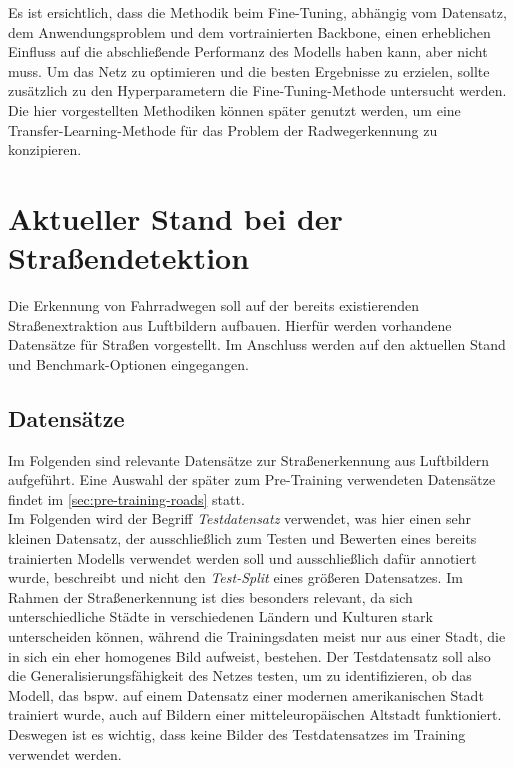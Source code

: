 Es ist ersichtlich, dass die Methodik beim Fine-Tuning, abhängig vom Datensatz, dem Anwendungsproblem und dem vortrainierten Backbone, einen erheblichen Einfluss 
auf die abschließende Performanz des Modells haben kann, aber nicht muss. 
Um das Netz zu optimieren und die besten Ergebnisse zu erzielen, sollte zusätzlich zu den Hyperparametern die Fine-Tuning-Methode untersucht werden. 
Die hier vorgestellten Methodiken können später genutzt werden, 
um eine Transfer-Learning-Methode für das Problem der Radwegerkennung zu konzipieren. 


\section{Aktueller Stand bei der Straßendetektion}

Die Erkennung von Fahrradwegen soll auf der bereits existierenden Straßenextraktion aus Luftbildern aufbauen.
Hierfür werden vorhandene Datensätze für Straßen vorgestellt. 
Im Anschluss werden auf den aktuellen Stand und Benchmark-Optionen eingegangen.

\subsection{Datensätze} \label{sec:road-detection:roads-data}

Im Folgenden sind relevante Datensätze zur Straßenerkennung aus Luftbildern aufgeführt. 
Eine Auswahl der später zum Pre-Training verwendeten Datensätze findet im \autoref{sec:pre-training-roads} statt.\\
Im Folgenden wird der Begriff \textit{Testdatensatz} verwendet, was hier einen sehr kleinen Datensatz, 
der ausschließlich zum Testen und Bewerten eines bereits 
trainierten Modells verwendet werden soll und ausschließlich dafür annotiert wurde, beschreibt 
und nicht den \textit{Test-Split} eines größeren Datensatzes. 
Im Rahmen der Straßenerkennung ist dies besonders relevant, 
da sich unterschiedliche Städte in verschiedenen Ländern und Kulturen stark unterscheiden können, 
während die Trainingsdaten meist nur aus einer Stadt, die in sich ein eher homogenes Bild aufweist, bestehen.
Der Testdatensatz soll also die Generalisierungsfähigkeit des Netzes testen, um zu identifizieren,
ob das Modell, das bspw. auf einem Datensatz einer modernen amerikanischen Stadt trainiert wurde, 
auch auf Bildern einer mitteleuropäischen Altstadt funktioniert. Deswegen ist es wichtig, 
dass keine Bilder des Testdatensatzes im Training verwendet werden. 

